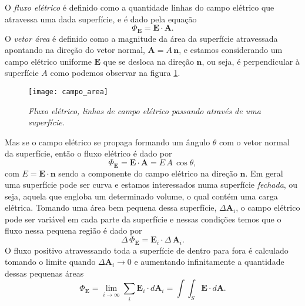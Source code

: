 O \textit{fluxo elétrico} é definido como a quantidade linhas do campo elétrico que atravessa uma dada superfície, e é dado pela equação
\begin{equation*}
\Phi_\textbf{E}=\textbf{E}\cdot\textbf{A}. 
\end{equation*} 
O \textit{vetor área} é definido como a magnitude da área da superfície atravessada apontando na direção do vetor normal, $\textbf{A}=A\,\textbf{n}$, e estamos considerando um campo elétrico uniforme $\textbf{E}$ que se desloca na direção $\textbf{n}$, ou seja, é perpendicular à superfície $A$ como podemos observar na figura \ref{fig.flux_ele}.
\begin{figure}[!htb]
\centering
\texttt{[image: campo\_area]}
\caption{\textit{Fluxo elétrico, linhas de campo elétrico passando através de uma superfície.}}
\label{fig.flux_ele}
\end{figure}
Mas se o campo elétrico se propaga formando um ângulo $\theta$ com o vetor normal da superfície, então o fluxo elétrico é dado por
\begin{equation*}
\Phi_\textbf{E}=\textbf{E}\cdot\textbf{A}=E\,A\,\cos\theta,
\end{equation*}
com $E=\textbf{E}\cdot\textbf{n}$ sendo a componente do campo elétrico na direção $\textbf{n}$. Em geral uma superfície pode ser curva e estamos interessados numa superfície \textit{fechada}, ou seja, aquela que engloba um determinado volume, o qual contém uma carga elétrica. Tomando uma área bem pequena dessa superfície, $\Delta\textbf{A}_i$, o campo elétrico pode ser variável em cada parte da superfície e nessas condições temos que o fluxo nessa pequena região é dado por
\begin{equation*}
\Delta\,\Phi_\textbf{E}=\textbf{E}_i\cdot\Delta\,\textbf{A}_i.
\end{equation*}
O fluxo positivo atravessando toda a superfície de dentro para fora é calculado tomando o limite quando $\Delta\textbf{A}_i\to 0$ e aumentando infinitamente a quantidade dessas pequenas áreas
\begin{equation}\label{eq.fluxo_eletr}
\Phi_\textbf{E}=\lim_{i\to\infty}\sum_i\textbf{E}_i\cdot\textit{d}\textbf{A}_i=\int\int_S\textbf{E}\cdot\textit{d}\textbf{A}.
\end{equation}


